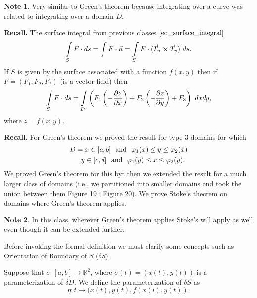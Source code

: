 \documentclass[
	12pt,
	]{article}
\newcommand{\R}{\mathbb{R}}
\theoremstyle{custom}
\theoremstyle{custom}
\theoremstyle{custom}
\theoremstyle{custom}
\theoremstyle{custom}
\theoremstyle{definition}
\theoremstyle{example}
\newtheorem*{note}{Note}
\theoremstyle{note}
\theoremstyle{remark}
\theoremstyle{example}
\newcounter{theo}[section]\setcounter{theo}{0}
\numberwithin{equation}{subsection}
\begin{document}
				\begin{note}
					Very similar to Green's theorem because integrating over a curve was related to integrating over a domain $D$.
				\end{note}
				\noindent \textbf{Recall.} The surface integral from previous classes $\eqref{eq_surface_integral}$
				$$ \int\limits_S F\cdot ds = \int\limits F\cdot \vec{n} = \int\limits_{S} F\cdot (\vec{T}_{u}\cross \vec{T}_{v}) \ ds. $$
				If $S$ is given by the surface associated with a function $f(x,y)$ then if $F = (F_{1}, F_{2}, F_{3})$ (is a vector field) then 
				\begin{equation}
					\int\limits_{S} F\cdot ds = \int\limits_{D} \left( F_{1} \left(-\pdv{z}{x}\right) + F_{2} \left(-\pdv{z}{y}\right) + F_{3}\right) \ dxdy, 
				\end{equation}				
				where $z = f(x,y)$.
				
				\noindent \textbf{Recall.} For Green's theorem we proved the result for type $3$ domains for which 
				\begin{align*}
					D &= x\in[a,b] \ \ \text{and} \ \ \varphi_{1}(x) \le y \le \varphi_{2}(x) \\
					&\hphantom{= } y\in[c,d] \ \ \text{and} \ \ \varphi_{1}(y) \le x \le \varphi_{2}(y). 
				\end{align*}
				We proved Green's theorem for this byt then we extended the result for a much larger class of domains (i.e., we partitioned into smaller domains and took the union between them Figure 19 ; Figure 20). We prove Stoke's theorem on domains where Green's theorem applies. 
				
				\begin{note}
					In this class, wherever Green's theorem applies Stoke's will apply as well even though it can be extended further.
				\end{note}
				
				\noindent Before invoking the formal definition we must clarify some concepts such as Orientation of Boundary of $S$ ($\delta S$).
				
				\noindent Suppose that $\sigma : [a,b] \to \R^{2}$, where $\sigma(t) = (x(t) , y(t))$ is a parameterization of $\delta D$. We define the parameterization of $\delta S$ as 
				\begin{equation}
					\eta : t\to (x(t), y(t), f(x(t) , y(t)).
				\end{equation}
				
\end{document}
